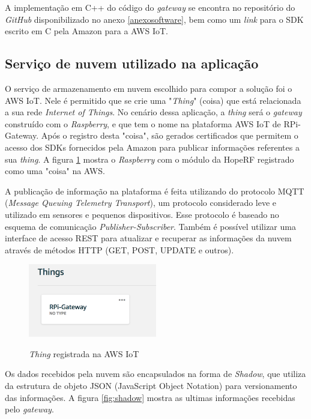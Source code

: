 \documentclass[
    hidelinks,
	12pt,				%
	openany,
	oneside, 
	a4paper,			%
	english,			%
	french,				%
	spanish,			%
	brazil				%
	]{abntex2}
\begin{document}
A implementação em C++ do código do \textit{gateway} se encontra no repositório do \textit{GitHub} disponibilizado no anexo \ref{anexosoftware}, bem como um \textit{link} para o SDK escrito em C pela Amazon para a AWS IoT.

\subsection{Serviço de nuvem utilizado na aplicação}

O serviço de armazenamento em nuvem escolhido para compor a solução foi o AWS IoT. Nele é permitido que se crie uma "\textit{Thing}" (coisa) que está relacionada a sua rede \textit{Internet of Things}. No cenário dessa aplicação, a \textit{thing} será o \textit{gateway} construído com o \textit{Raspberry}, e que tem o nome na plataforma AWS IoT de RPi-Gateway. Após o registro desta "coisa", são gerados certificados que permitem o acesso dos SDKs fornecidos pela Amazon para publicar informações referentes a sua \textit{thing}. A figura \ref{fig:thing} mostra o \textit{Raspberry} com o módulo da HopeRF registrado como uma "coisa" na AWS.

A publicação de informação na plataforma é feita utilizando do protocolo MQTT (\textit{Message Queuing Telemetry Transport}), um protocolo considerado leve e utilizado em sensores e pequenos dispositivos. Esse protocolo é baseado no esquema de comunicação \textit{Publisher-Subscriber}. Também é possível utilizar uma interface de acesso REST para atualizar e recuperar as informações da nuvem através de métodos HTTP (GET, POST, UPDATE e outros). 

\begin{figure}[ht]
    \centering
    \caption{\textit{Thing} registrada na AWS IoT}
    \includegraphics[width=0.5\textwidth]{thing.png}
    \label{fig:thing}
\end{figure}

Os dados recebidos pela nuvem são encapsulados na forma de \textit{Shadow}, que utiliza da estrutura de objeto JSON (JavaScript Object Notation) para versionamento das informações. A figura \ref{fig:shadow} mostra as ultimas informações recebidas pelo \textit{gateway}.
\end{document}
